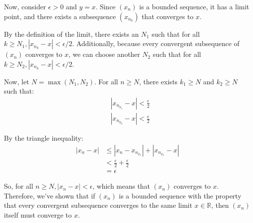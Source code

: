 \documentclass{report}
\begin{document}
Now, consider $\epsilon>0$ and $y=x$. Since $\left(x_n\right)$ is a bounded sequence, it has a limit point, and there exists a subsequence $\left(x_{n_k}\right)$ that converges to $x$.

By the definition of the limit, there exists an $N_1$ such that for all $k \geq N_1,\left|x_{n_{k}}-x\right|<\epsilon / 2$.
Additionally, because every convergent subsequence of $\left(x_n\right)$ converges to $x$, we can choose another $N_2$ such that for all $k \geq N_2,\left|x_{n_k}-x\right|<\epsilon / 2$.

Now, let $N=\max \left(N_1, N_2\right)$. For all $n \geq N$, there exists $k_1 \geq N$ and $k_2 \geq N$ such that:
$$
\begin{aligned}
& \left|x_{n_{k_1}}-x\right|<\frac{\epsilon}{2} \\
& \left|x_{n_{k_2}}-x\right|<\frac{\epsilon}{2}
\end{aligned}
$$

By the triangle inequality:
$$
\begin{aligned}
\left|x_n-x\right| & \leq\left|x_n-x_{n_{k_1}}\right|+\left|x_{n_{k_1}}-x\right| \\
& <\frac{\epsilon}{2}+\frac{\epsilon}{2} \\
& =\epsilon
\end{aligned}
$$

So, for all $n \geq N,\left|x_n-x\right|<\epsilon$, which means that $\left(x_n\right)$ converges to $x$.
Therefore, we've shown that if $\left(x_n\right)$ is a bounded sequence with the property that every convergent subsequence converges to the same limit $x \in \mathbb{R}$, then $\left(x_n\right)$ itself must converge to $x$.
\end{document}
